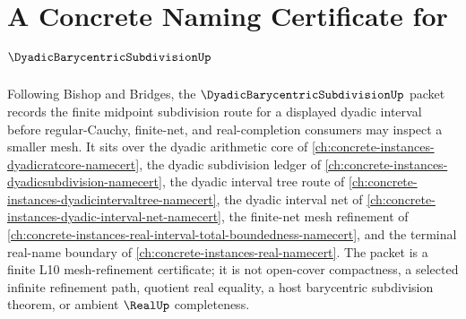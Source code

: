 \chapter{A Concrete Naming Certificate for $\DyadicBarycentricSubdivisionUp$}
\label{ch:concrete-instances-dyadic-barycentric-subdivision-namecert}

Following Bishop and Bridges, the $\DyadicBarycentricSubdivisionUp$ packet records the finite midpoint subdivision route for a displayed dyadic interval before regular-Cauchy, finite-net, and real-completion consumers may inspect a smaller mesh. It sits over the dyadic arithmetic core of \autoref{ch:concrete-instances-dyadicratcore-namecert}, the dyadic subdivision ledger of \autoref{ch:concrete-instances-dyadicsubdivision-namecert}, the dyadic interval tree route of \autoref{ch:concrete-instances-dyadicintervaltree-namecert}, the dyadic interval net of \autoref{ch:concrete-instances-dyadic-interval-net-namecert}, the finite-net mesh refinement of \autoref{ch:concrete-instances-real-interval-total-boundedness-namecert}, and the terminal real-name boundary of \autoref{ch:concrete-instances-real-namecert}. The packet is a finite L10 mesh-refinement certificate; it is not open-cover compactness, a selected infinite refinement path, quotient real equality, a host barycentric subdivision theorem, or ambient $\RealUp$ completeness.

